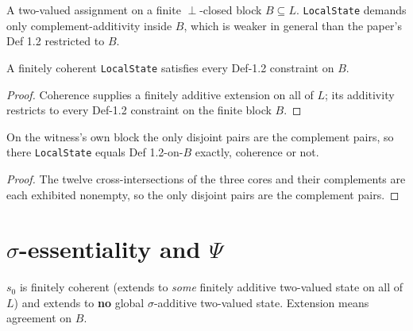 \begin{definition}
\label{def:local-pattern}
\leanok
{}
A two-valued assignment on a finite $\perp$-closed block $B \subseteq L$.
\texttt{LocalState} demands only complement-additivity inside $B$, which is
weaker in general than the paper's Def 1.2 restricted to $B$.
\end{definition}

\begin{lemma}
\label{lem:pattern-fully-additive}
\leanok
{}
A finitely coherent \texttt{LocalState} satisfies every Def-1.2 constraint on
$B$.
\end{lemma}

\begin{proof}
\leanok
Coherence supplies a finitely additive extension on all of $L$; its additivity restricts to every Def-1.2 constraint on the finite block $B$.
\end{proof}

\begin{lemma}
\label{lem:coreblock-disjoint}
\leanok
{}
On the witness's own block the only disjoint pairs are the complement pairs, so
there \texttt{LocalState} equals Def 1.2-on-$B$ exactly, coherence or not.
\end{lemma}

\begin{proof}
\leanok
The twelve cross-intersections of the three cores and their complements are each exhibited nonempty, so the only disjoint pairs are the complement pairs.
\end{proof}

\section{$\sigma$-essentiality and $\Psi$}

\begin{definition}
\label{def:sigma-essential}
\leanok
{}
$s_0$ is finitely coherent (extends to \emph{some} finitely additive
two-valued state on all of $L$) and extends to \textbf{no} global
$\sigma$-additive two-valued state. Extension means agreement on $B$.
\end{definition}

